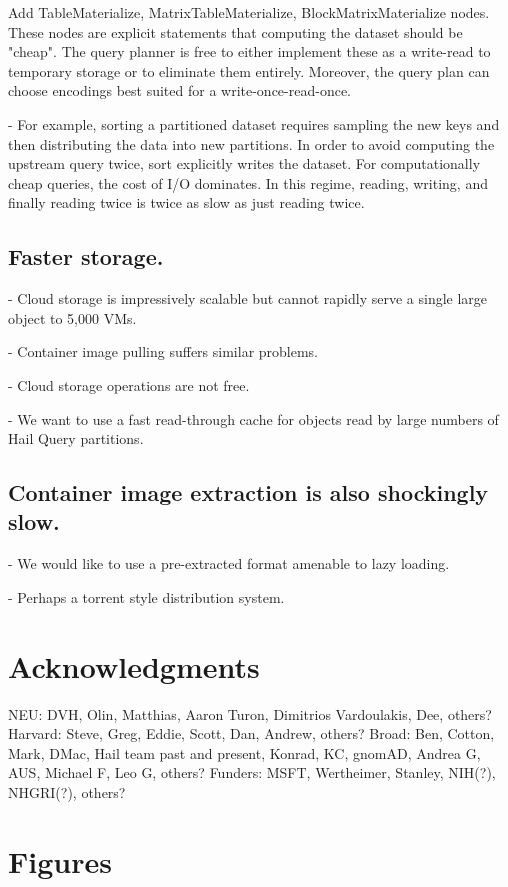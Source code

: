 \documentclass[10pt,a4paper%
]{article}
\begin{document}
Add TableMaterialize, MatrixTableMaterialize, BlockMatrixMaterialize nodes. These nodes are explicit statements that computing the dataset should be "cheap". The query planner is free to either implement these as a write-read to temporary storage or to eliminate them entirely. Moreover, the query plan can choose encodings best suited for a write-once-read-once.

    - For example, sorting a partitioned dataset requires sampling the new keys and then distributing the data into new partitions. In order to avoid computing the upstream query twice, sort explicitly writes the dataset. For computationally cheap queries, the cost of I/O dominates. In this regime, reading, writing, and finally reading twice is twice as slow as just reading twice.

\subsection{Faster storage.}

    - Cloud storage is impressively scalable but cannot rapidly serve a single large object to 5,000 VMs.

    - Container image pulling suffers similar problems.

    - Cloud storage operations are not free.

    - We want to use a fast read-through cache for objects read by large numbers of Hail Query partitions.

\subsection{Container image extraction is also shockingly slow.}

    - We would like to use a pre-extracted format amenable to lazy loading.

    - Perhaps a torrent style distribution system.

\section{Acknowledgments}

NEU: DVH, Olin, Matthias, Aaron Turon, Dimitrios Vardoulakis, Dee, others? Harvard: Steve, Greg, Eddie, Scott, Dan, Andrew, others? Broad: Ben, Cotton, Mark, DMac, Hail team past and present, Konrad, KC, gnomAD, Andrea G, AUS, Michael F, Leo G, others? Funders: MSFT, Wertheimer, Stanley, NIH(?), NHGRI(?), others?

\section{Figures}
\end{document}
